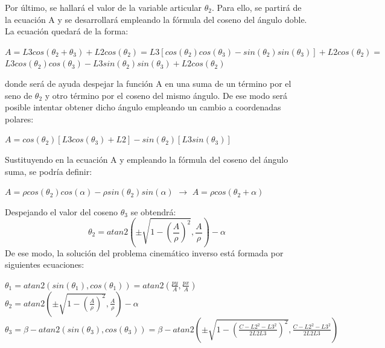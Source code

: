 	\newpage
	Por último, se hallará el valor de la variable articular $\theta_{2}$. Para ello, se partirá de la ecuación A y se desarrollará empleando la fórmula del coseno del ángulo doble. La ecuación quedará de la forma: \\
	\begin{center}
		$A=L3cos(\theta_{2}+\theta_{3})+L2cos(\theta_{2})=L3[cos(\theta_{2})cos(\theta_{3})-sin(\theta_{2})sin(\theta_{3})]+L2cos(\theta_{2})=$\\ \vspace{0.3cm} $L3cos(\theta_{2})cos(\theta_{3})-L3sin(\theta_{2})sin(\theta_{3})+L2cos(\theta_{2})$
	\end{center}
donde será de ayuda despejar la función A en una suma de un término por el seno de $ \theta_{2}$ y otro término por el coseno del mismo ángulo. De ese modo será posible intentar obtener dicho ángulo empleando un cambio a coordenadas polares:
	\begin{center}
		$A=cos(\theta_{2})[L3cos(\theta_{3})+L2]-sin(\theta_{2})[L3sin(\theta_{3})]$\\
		\vspace{0.3cm}
		\hfill
	\end{center}
	Sustituyendo en la ecuación A y empleando la fórmula del coseno del ángulo suma, se podría definir:\\
	\begin{center}
	$A=\rho cos(\theta_{2})cos(\alpha)-\rho sin(\theta_{2})sin(\alpha)$ $\rightarrow$ $A=\rho cos(\theta_{2}+\alpha)$
	\end{center}

	Despejando el valor del coseno $\theta_{3}$ se obtendrá:
	\begin{equation}
	\theta_{2}=atan2(\pm \sqrt{1-(\frac{A}{\rho})^{2}},\frac{A}{\rho})-\alpha
	\end{equation}
	De ese modo, la solución del problema cinemático inverso está formada por siguientes ecuaciones:
	\begin{center}
		$\theta_{1}=atan2(sin(\theta_{1}),cos(\theta_{1}))=atan2(\frac{py}{A},\frac{px}{A})$ \\
		$\theta_{2}=atan2(\pm \sqrt{1-(\frac{A}{\rho})^{2}},\frac{A}{\rho})-\alpha$ \\
		$\theta_{3}=\beta -atan2(sin(\theta_{3}),cos(\theta_{3}))=\beta-atan2(\pm \sqrt{1-(\frac{C-L2^{2}-L3^{2}}{2L2L3})^{2}},\frac{C-L2^{2}-L3^{2}}{2L2L3} )$
	\end{center}

